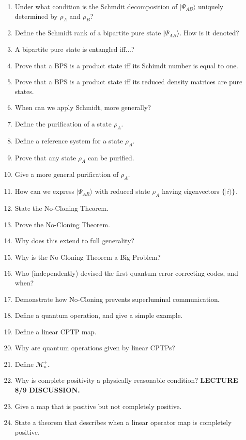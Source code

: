 \documentclass{article}
\newcommand{\mc}[1]{\mathcal{#1}}
\newcommand{\ket}[1]{|#1\rangle}
\begin{document}
\begin{enumerate}
    \item Under what condition is the Schmdit decomposition of $\ket{\Psi_{AB}}$ uniquely determined by $\rho_A$ and $\rho_B$?
    \item Define the Schmidt rank of a bipartite pure state $\ket{\Psi_{AB}}$. How is it denoted?
    \item A bipartite pure state is entangled iff...?
    \item Prove that a BPS is a product state iff its Schimdt number is equal to one.
    \item Prove that a BPS is a product state iff its reduced density matrices are pure states.
    \item When can we apply Schmidt, more generally?
    \item Define the purification of a state $\rho_A$.
    \item Define a reference system for a state $\rho_A$.
    \item Prove that any state $\rho_A$ can be purified.
    \item Give a more general purification of $\rho_A$.
    \item How can we express $\ket{\Psi_{AR}}$ with reduced state $\rho_A$ having eigenvectors $\{\ket{i}\}$.
    \item State the No-Cloning Theorem.
    \item Prove the No-Cloning Theorem.
    \item Why does this extend to full generality?
    \item Why is the No-Cloning Theorem a Big Problem?
    \item Who (independently) devised the first quantum error-correcting codes, and when?
    \item Demonstrate how No-Cloning prevents superluminal communication.
    \item Define a quantum operation, and give a simple example.
    \item Define a linear CPTP map.
    \item Why are quantum operations given by linear CPTPs?
    \item Define $\mc{M}_n^+$.
    \item Why is complete positivity a physically reasonable condition? \textbf{LECTURE 8/9 DISCUSSION.}
    \item Give a map that is positive but not completely positive.
    \item State a theorem that describes when a linear operator map is completely positive.

\end{enumerate}
\end{document}
